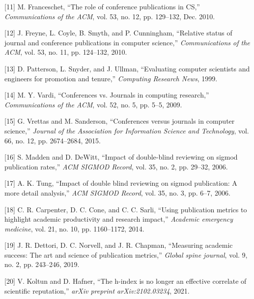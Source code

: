\documentclass[12pt]{article}
\begin{document}
\leavevmode\hypertarget{ref-franceschet10:role}{}%
{[}11{]} M. Franceschet, ``The role of conference publications in CS,'' \emph{Communications of the ACM}, vol. 53, no. 12, pp. 129--132, Dec. 2010.

\leavevmode\hypertarget{ref-freyne10:relative}{}%
{[}12{]} J. Freyne, L. Coyle, B. Smyth, and P. Cunningham, ``Relative status of journal and conference publications in computer science,'' \emph{Communications of the ACM}, vol. 53, no. 11, pp. 124--132, 2010.

\leavevmode\hypertarget{ref-patterson99:evaluating}{}%
{[}13{]} D. Patterson, L. Snyder, and J. Ullman, ``Evaluating computer scientists and engineers for promotion and tenure,'' \emph{Computing Research News}, 1999.

\leavevmode\hypertarget{ref-vardi09:conferences}{}%
{[}14{]} M. Y. Vardi, ``Conferences vs. Journals in computing research,'' \emph{Communications of the ACM}, vol. 52, no. 5, pp. 5--5, 2009.

\leavevmode\hypertarget{ref-vrettas15:conferences}{}%
{[}15{]} G. Vrettas and M. Sanderson, ``Conferences versus journals in computer science,'' \emph{Journal of the Association for Information Science and Technology}, vol. 66, no. 12, pp. 2674--2684, 2015.

\leavevmode\hypertarget{ref-madden06:impact}{}%
{[}16{]} S. Madden and D. DeWitt, ``Impact of double-blind reviewing on sigmod publication rates,'' \emph{ACM SIGMOD Record}, vol. 35, no. 2, pp. 29--32, 2006.

\leavevmode\hypertarget{ref-tung06:impact}{}%
{[}17{]} A. K. Tung, ``Impact of double blind reviewing on sigmod publication: A more detail analysis,'' \emph{ACM SIGMOD Record}, vol. 35, no. 3, pp. 6--7, 2006.

\leavevmode\hypertarget{ref-carpenter14:metrics}{}%
{[}18{]} C. R. Carpenter, D. C. Cone, and C. C. Sarli, ``Using publication metrics to highlight academic productivity and research impact,'' \emph{Academic emergency medicine}, vol. 21, no. 10, pp. 1160--1172, 2014.

\leavevmode\hypertarget{ref-dettori19:measuring}{}%
{[}19{]} J. R. Dettori, D. C. Norvell, and J. R. Chapman, ``Measuring academic success: The art and science of publication metrics,'' \emph{Global spine journal}, vol. 9, no. 2, pp. 243--246, 2019.

\leavevmode\hypertarget{ref-koltun21:hindex}{}%
{[}20{]} V. Koltun and D. Hafner, ``The h-index is no longer an effective correlate of scientific reputation,'' \emph{arXiv preprint arXiv:2102.03234}, 2021.
\end{document}
